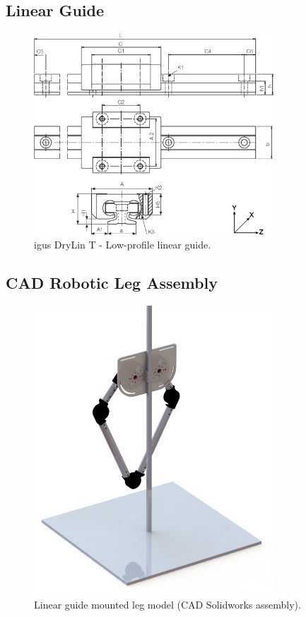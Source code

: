 \subsection{Linear Guide}
\begin{figure}
\centering
\includegraphics[width=0.8\textwidth]{images/mechanical/drylin-linear-guide.png} 
\caption{igus DryLin T - Low-profile linear guide.}
\label{fig:drylin-linear-guide}
\end{figure}

\subsection{CAD Robotic Leg Assembly}
\begin{figure}
\centering
\includegraphics[width=0.8\textwidth]{images/mechanical/back-shot.png} 
\caption{Linear guide mounted leg model (CAD Solidworks assembly).}
\label{fig:Linear guide mounted leg model}
\end{figure}


